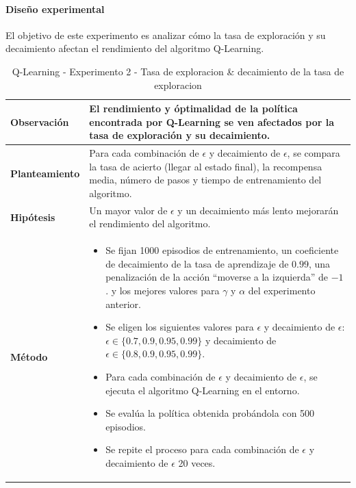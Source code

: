 \paragraph{Diseño experimental}
El objetivo de este experimento es analizar cómo la tasa de exploración y su decaimiento afectan el rendimiento del algoritmo Q-Learning.

\begin{table}[H]
    \centering
    \begin{tabularx}{\textwidth}{|p{4cm}|X|} %
        \hline %
        \textbf{Observación} & El rendimiento y óptimalidad de la política encontrada por Q-Learning se ven afectados por la tasa de exploración y su decaimiento. 
        \\ \hline 
        \textbf{Planteamiento} & Para cada combinación de \(\epsilon\) y decaimiento de \(\epsilon\), se compara la tasa de acierto (llegar al estado final), la recompensa media, número de pasos y tiempo de entrenamiento del algoritmo.
        \\ \hline 
        \textbf{Hipótesis} & Un mayor valor de \(\epsilon\) y un decaimiento más lento mejorarán el rendimiento del algoritmo.
        \\ \hline 
        \textbf{Método} & 
        \begin{itemize}
            \item Se fijan 1000 episodios de entrenamiento,  un coeficiente de decaimiento de la tasa de aprendizaje de $0.99$, una penalización de la acción ``moverse a la izquierda'' de $-1$. y los mejores valores para \(\gamma\) y $\alpha$ del experimento anterior.
            \item Se eligen los siguientes valores para \(\epsilon\) y decaimiento de \(\epsilon\): \(\epsilon \in \{0.7, 0.9, 0.95, 0.99\}\) y decaimiento de \(\epsilon \in \{0.8, 0.9, 0.95, 0.99\}\).
            \item Para cada combinación de \(\epsilon\) y decaimiento de \(\epsilon\), se ejecuta el algoritmo Q-Learning en el entorno.
            \item Se evalúa la política obtenida probándola con 500 episodios.
            \item Se repite el proceso para cada combinación de \(\epsilon\) y decaimiento de \(\epsilon\) 20 veces.
        \end{itemize}
        \\ \hline
    \end{tabularx}
    \caption{Q-Learning - Experimento 2 - Tasa de exploracion \& decaimiento de la tasa de exploracion}
    \label{tab:diseñoQLEarningExp2}
\end{table}

